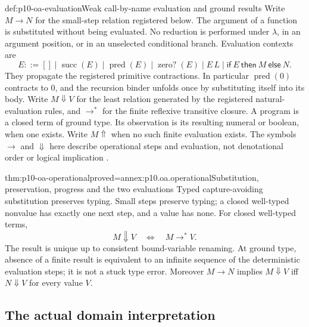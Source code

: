 \begin{hbdefinition}{def:p10-oa-evaluation}{Weak call-by-name evaluation and ground results}
Write \(M\to N\) for the small-step relation registered below.
The argument of a function is substituted without being evaluated.
No reduction is performed under \(\lambda\), in an argument position,
or in an unselected conditional branch. Evaluation contexts are
\[
 E::=[]\mid\operatorname{succ}(E)\mid\operatorname{pred}(E)
 \mid\operatorname{zero?}(E)\mid E\,L
 \mid\mathsf{if}\ E\ \mathsf{then}\ M\ \mathsf{else}\ N.
\]
They propagate the registered primitive contractions. In particular
\(\operatorname{pred}(0)\) contracts to \(0\), and the recursion
binder unfolds once by substituting itself into its body.
Write \(M\Downarrow V\) for the least relation generated by the
registered natural-evaluation rules, and \(\to^*\) for the finite
reflexive transitive closure. A program is a closed term of ground type.
Its observation is its resulting numeral or boolean, when one exists.
Write \(M\Uparrow\) when no such finite evaluation exists.
The symbols \(\to\) and \(\Downarrow\) here describe operational
steps and evaluation, not denotational order or logical implication
\cite[Tables~7--8; Theorem~4.2.2, pp.~31--33]{Gunter1994TypesAuthorOA}.
\end{hbdefinition}



\begin{hbtheorem}{thm:p10-oa-operational}{proved=annex:p10.oa.operational}{Substitution, preservation, progress and the two evaluations}
Typed capture-avoiding substitution preserves typing. Small steps preserve
typing; a closed well-typed nonvalue has exactly one next step, and a
value has none. For closed well-typed terms,
\[
 M\Downarrow V\quad\Longleftrightarrow\quad M\to^*V.
\]
The result is unique up to consistent bound-variable renaming.
At ground type, absence of a finite result is equivalent to an infinite
sequence of the deterministic evaluation steps; it is not a stuck
type error. Moreover \(M\to N\) implies
\(M\Downarrow V\) iff \(N\Downarrow V\) for every value \(V\).
\end{hbtheorem}

\subsection{The actual domain interpretation}

